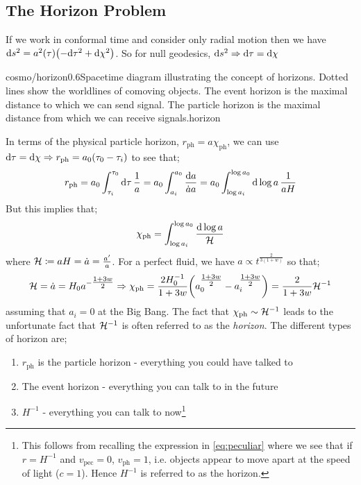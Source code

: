 \subsection{The Horizon Problem}
If we work in conformal time and consider only radial motion then we have $\ud s^2 = a^2(\tau)\left(-\ud \tau^2 + \ud \chi^2\right)$. So for null geodesics, $\text{d} s^2 \Rightarrow \text{d} \tau = \text{d} \chi$
\begin{mygraphic}{cosmo/horizon}{0.6}{Spacetime diagram illustrating the concept of horizons. Dotted lines show the worldlines of comoving objects. The event horizon is the maximal distance to which we can send signal. The particle horizon is the maximal distance from which we can receive signals.}{horizon}\end{mygraphic}
In terms of the physical particle horizon, $r_{\text{ph}} = a \chi_{\text{ph}}$, we can use $\text{d} \tau = \text{d} \chi \Rightarrow r_{\text{ph}} = a_0 (\tau_0 - \tau_i)$ to see that;
\begin{equation}
r_{\text{ph}} = a_0 \int_{\tau_i}^{\tau_0}{\text{d}\tau \,\frac{1}{a}} = a_0 \int_{a_i}^{a_0}{\frac{\text{d} a}{\dot{a}a}} = a_0 \int_{\log a_i}^{\log a_0}{\text{d}\log a \, \frac{1}{aH}}
\end{equation}
But this implies that;
\begin{equation}
\chi_{\text{ph}} = \int_{\log a_i}^{\log a_0}{\frac{\text{d} \log a}{\mathcal{H}}}
\end{equation}
where $\mathcal{H} \coloneqq aH = \dot{a} = \tfrac{a^{\prime}}{a}$. For a perfect fluid, we have $a \propto t^{\tfrac{2}{3(1+w)}}$ so that;
\begin{equation}
\label{eq:horizona}
\hamilt = \dot{a} = H_0 a^{-\tfrac{1+3w}{2}} \Rightarrow \chi_{\text{ph}} = \frac{2 H_0^{-1}}{1 + 3w}\left(a_0^{\tfrac{1+3w}{2}} - a_i^{\tfrac{1+3w}{2}}\right) = \frac{2}{1 + 3w}\hamilt^{-1}
\end{equation}
assuming that $a_i = 0$ at the Big Bang. The fact that $\chi_{\text{ph}} \sim \mathcal{H}^{-1}$ leads to the unfortunate fact that $\mathcal{H}^{-1}$ is often referred to as the \emph{horizon}. The different types of horizon are;
\begin{enumerate}
\item $r_{\text{ph}}$ is the particle horizon - everything you could have talked to
\item The event horizon - everything you can talk to in the future
\item $H^{-1}$ - everything you can talk to now\footnote{This follows from recalling the expression in \eqref{eq:peculiar} where we see that if $r = H^{-1}$ and $v_{\text{pec}} = 0$, $v_{\text{ph}} = 1$, i.e. objects appear to move apart at the speed of light ($c = 1$). Hence $H^{-1}$ is referred to as the horizon.}
\end{enumerate}
